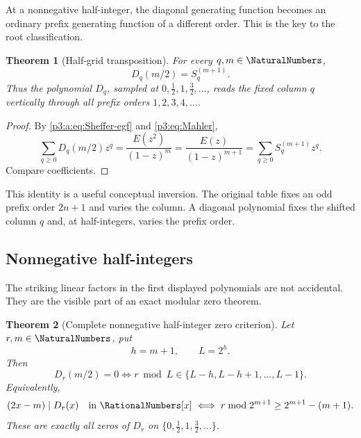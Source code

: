 \documentclass[11pt,oneside]{article}
\numberwithin{equation}{section}
\newtheorem{theorem}{Theorem}[section]
\theoremstyle{definition}
\theoremstyle{remark}
\begin{document}
At a nonnegative half-integer, the diagonal generating function becomes an
ordinary prefix generating function of a different order.  This is the key
to the root classification.

\begin{theorem}[Half-grid transposition]\label{p3:c:thm:transposition}
For every \(q,m\in\NaturalNumbers\),
\begin{equation}
 \boxed{D_q(m/2)=S_{q}^{(m+1)}.}                     \label{p3:c:eq:transposition}
\end{equation}
Thus the polynomial \(D_q\), sampled at
\(0,\tfrac12,1,\tfrac32,\ldots\), reads the fixed column \(q\) vertically
through all prefix orders \(1,2,3,4,\ldots\).
\end{theorem}

\begin{proof}
By \cref{p3:a:eq:Sheffer-egf} and \cref{p3:eq:Mahler},
\[
 \sum_{q\geq0}D_q(m/2)z^q
 =\frac{E(z^2)}{(1-z)^m}
 =\frac{E(z)}{(1-z)^{m+1}}
 =\sum_{q\geq0}S_{q}^{(m+1)}z^q.
\]
Compare coefficients.
\end{proof}

This identity is a useful conceptual inversion.  The original table fixes an
odd prefix order \(2n+1\) and varies the column.  A diagonal polynomial fixes
the shifted column \(q\) and, at half-integers, varies the prefix order.
\subsection{Nonnegative half-integers}

The striking linear factors in the first displayed polynomials are not
accidental.  They are the visible part of an exact modular zero theorem.

\begin{theorem}[Complete nonnegative half-integer zero criterion]\label{p3:a:thm:half-root}
Let \(r,m\in\NaturalNumbers\), put
\begin{equation}
 h=m+1,
 \qquad
 L=2^h.
 \label{p3:a:eq:half-root-hL}
\end{equation}
Then
\begin{equation}
 \boxed{
 D_r(m/2)=0
 \iff
 r\bmod L\in\{L-h,L-h+1,\ldots,L-1\}.}
 \label{p3:a:eq:half-root-criterion}
\end{equation}
Equivalently,
\begin{equation}
 (2x-m)\mid D_r(x)\quad\text{in }\RationalNumbers[x]
 \iff
 r\bmod 2^{m+1}\ge2^{m+1}-(m+1).
 \label{p3:a:eq:factor-criterion}
\end{equation}
These are exactly all zeros of \(D_r\) on
\(\{0,\tfrac12,1,\tfrac32,\ldots\}\).
\end{theorem}
\end{document}
